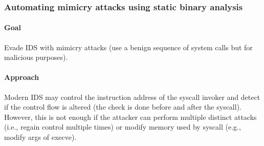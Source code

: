\subsubsection{\cite{KKM-USEC05} Automating mimicry attacks using static binary analysis} 

\paragraph{Goal}
Evade IDS with mimicry attacks (use a benign sequence of system calls but for malicious purposes).

\paragraph{Approach}
Modern IDS may control the instruction address of the syscall invoker and detect if the control flow is altered (the check is done before and after the syscall). However, this is not enough if the attacker can perform multiple distinct attacks (i.e., regain control multiple times) or modify memory used by syscall (e.g., modify args of execve). \\

